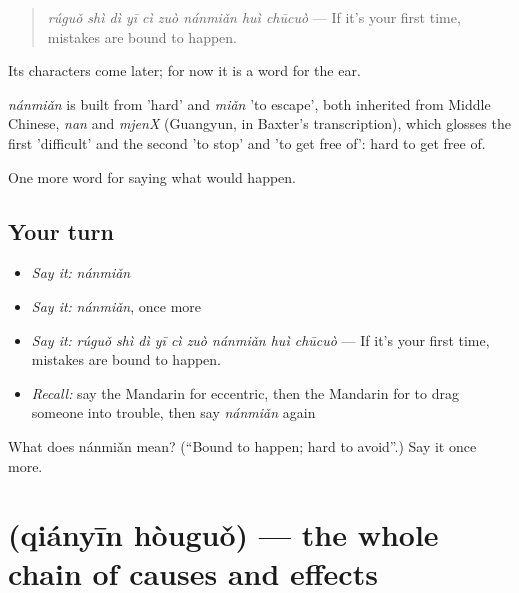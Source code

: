 \begin{quote}
\emph{rúguǒ shì dì yī cì zuò nánmiǎn huì chūcuò} — If it's your first time, mistakes are bound to happen.
\end{quote}

Its characters come later; for now it is a word for the ear.

\begin{cousinweb}
\emph{nánmiǎn} is built from  'hard' and \emph{miǎn} 'to escape', both inherited from Middle Chinese, \emph{nan} and \emph{mjenX} (Guangyun, in Baxter's transcription), which glosses the first 'difficult' and the second 'to stop' and 'to get free of': hard to get free of.
\end{cousinweb}

\begin{grammarlens}[title={What you've built}]
One more word for saying what would happen.
\end{grammarlens}

\subsection*{Your turn}
\begin{itemize}
\raggedright
  \item \emph{Say it:} \emph{nánmiǎn}
  \item \emph{Say it:} \emph{nánmiǎn}, once more
  \item \emph{Say it:} \emph{rúguǒ shì dì yī cì zuò nánmiǎn huì chūcuò} — If it's your first time, mistakes are bound to happen.
  \item \emph{Recall:} say the Mandarin for eccentric, then the Mandarin for to drag someone into trouble, then say \emph{nánmiǎn} again
\end{itemize}

\begin{tcolorbox}[breakable,colback=teal!4,colframe=teal!35!black,title={Before you move on}]
What does nánmiǎn mean? (\textquotedblleft{}Bound to happen; hard to avoid\textquotedblright{}.) Say it once more.
\end{tcolorbox}
\section[\texorpdfstring{\zh{前因后果} (qiányīn hòuguǒ)}{前因后果 (qiányīn hòuguǒ)}]{ (qiányīn hòuguǒ) — the whole chain of causes and effects}

\label{lesson:ZH-C540-qianyinhouguo}



